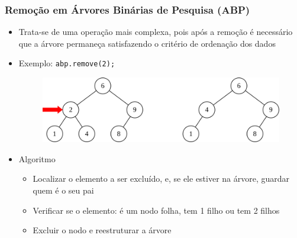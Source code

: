 \documentclass[aspectratio=169]{beamer}
\begin{document}
\begin{frame}\frametitle{Remoção em Árvores Binárias de Pesquisa (ABP)}
\begin{itemize}
	\item Trata-se de uma operação mais complexa, pois após a remoção é necessário que a árvore permaneça satisfazendo o critério de ordenação dos dados\\
	\item Exemplo: \texttt{abp.remove(2);}\\
\begin{figure}[h]
	\centering
	\includegraphics[height=0.3\paperheight]{imagens/abp-remocao1.png}
\end{figure}
	\item Algoritmo\\
	\begin{itemize}
		\item Localizar o elemento a ser excluído, e, se ele estiver na árvore, guardar quem é o seu pai\\
		\item Verificar se o elemento: é um nodo folha, tem 1 filho ou tem 2 filhos\\
		\item Excluir o nodo e reestruturar a árvore\\
	\end{itemize}
\end{itemize}
\end{frame}
\end{document}
